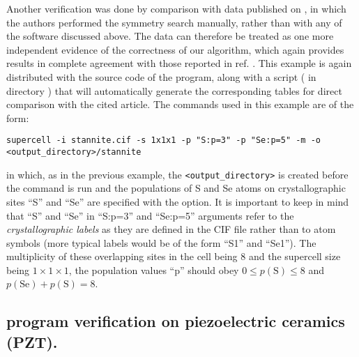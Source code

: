 \documentclass[a4paper,10pt]{article}
\begin{document}
Another verification was done by comparison with data published on \cite{Dun2014}, in which the authors performed the symmetry search manually, rather than with any of the software discussed above. The data can therefore be treated as one more independent evidence of the correctness of our algorithm, which again provides results in complete agreement with those reported in ref. \cite{Dun2014}. This example is again distributed with the source code of the \sups{} program, along with a script ( in directory ) that will automatically generate the corresponding tables for direct comparison with the cited article. The \sups{} commands used in this example are of the form:
\begin{Verbatim}[breaklines]
  supercell -i stannite.cif -s 1x1x1 -p "S:p=3" -p "Se:p=5" -m -o <output_directory>/stannite
\end{Verbatim}
in which, as in the previous example, the \texttt{<output\_directory>} is created before the command is run and the populations of S and Se atoms on crystallographic sites ``S'' and ``Se'' are specified with the  option. It is important to keep in mind that ``S'' and ``Se'' in ``S:p=3'' and ``Se:p=5'' arguments refer to the \textit{crystallographic labels} as they are defined in the CIF file rather than to atom symbols (more typical labels would be of the form ``S1'' and ``Se1''). The multiplicity of these overlapping sites in the cell being 8 and the supercell size being $1\times1\times1$, the population values ``p'' should obey $0 \leq p(\text{S})\leq 8$ and $p(\text{Se}) + p(\text{S})=8$.

\subsection*{\Sups{} program verification on piezoelectric ceramics  (PZT).}
\end{document}
